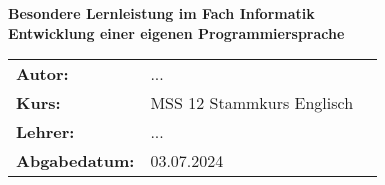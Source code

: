 \documentclass[12pt]{article}
\begin{document}
\begin{titlepage}
    \begin{center}
        {\large \bf Besondere Lernleistung im Fach Informatik}\\[8mm]
        {\Huge \bf Entwicklung einer eigenen Programmiersprache}\\[1cm]

    

        
    \end{center}
    \vfill
    \begin{minipage}[t]{0.4\textwidth}
        \begin{flushleft}
            \begin{tabular}{lll}
                \textbf{Autor:} & ... & \\
                \textbf{Kurs:} & MSS 12 Stammkurs Englisch & \\
                \textbf{Lehrer:} & ...& \\
                \textbf{Abgabedatum:} & 03.07.2024 & \\
            \end{tabular}
        \end{flushleft}
    \end{minipage}
\end{titlepage}
\tableofcontents
\newpage

    






\end{document}
